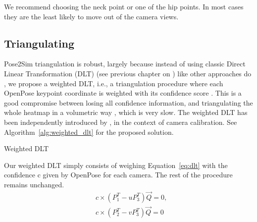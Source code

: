We recommend choosing the neck point or one of the hip points. In most cases they are the least likely to move out of the camera views.


\subsection{Triangulating}

Pose2Sim triangulation is robust, largely because instead of using classic Direct Linear Transformation (DLT) (see previous chapter on ) like other approaches do \cite{Hidalgo2021,Matthis2022,Sheshadri2020,Easymocap2021}, we propose a weighted DLT, i.e., a triangulation procedure where each OpenPose keypoint coordinate is weighted with its confidence score \cite{Pagnon2021}. This is a good compromise between losing all confidence information, and triangulating the whole heatmap in a volumetric way \cite{Iskakov2019}, which is very slow. The weighted DLT has been independently introduced by \cite{Barone2020}, in the context of camera calibration. See Algorithm~\ref{alg:weighted_dlt} for the proposed solution. 

\begin{algorithm}[!ht]
      \caption{Weighted DLT}\label{alg:weighted_dlt}
      \begin{algorithmic}[1]
            \STATEx Our weighted DLT simply consists of weighing Equation~\ref{eq:dlt} with the confidence c given by OpenPose for each camera. The rest of the procedure remains unchanged.
            \begin{equation}
                  \begin{aligned}
                  & c \times (P_1^T - u P_3^T) \overrightarrow{Q}=0,\\
                  & c \times (P_2^T - v P_3^T) \overrightarrow{Q}=0
                  \end{aligned}
          \end{equation}
      \end{algorithmic}
\end{algorithm}

